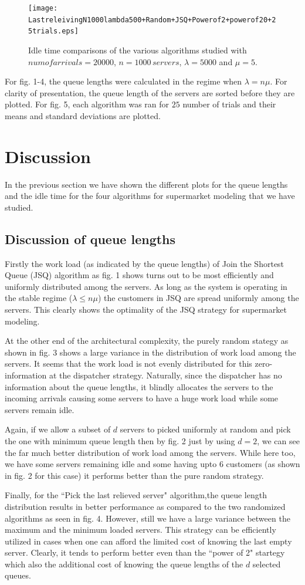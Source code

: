 \documentclass[a4paper,english,12pt]{article}
\begin{document}
\begin{figure}[H]
\centering
\texttt{[image: LastreleivingN1000lambda500+Random+JSQ+Powerof2+powerof20+25trials.eps]}
\caption{Idle time comparisons of the various algorithms studied with $num of arrivals = 20000$, $n = 1000 \, servers$, $\lambda = 5000$ and $\mu = 5$.} 
\end{figure}
For fig. 1-4, the queue lengths were calculated in the regime when $\lambda = n\mu$.  For clarity of presentation, the queue length of the servers are sorted before they are plotted. For fig. 5, each algorithm was ran for $25$ number of trials and their means and standard deviations are plotted. 
\section{Discussion}
In the previous section we have shown the different plots for the queue lengths and the idle time for the four algorithms for supermarket modeling that we have studied.
\subsection{Discussion of queue lengths}
\par Firstly the work load (as indicated by the queue lengths) of Join the Shortest Queue (JSQ) algorithm as fig. 1 shows turns out to be most efficiently and uniformly distributed among the servers. As long as the system is operating in the stable regime ($\lambda \leq n\mu$) the customers in JSQ are spread uniformly among the servers. This clearly shows the optimality of the JSQ strategy for supermarket modeling.
\par At the other end of the architectural complexity, the purely random stategy as shown in fig. 3 shows a large variance in the distribution of work load among the servers. It seems that the work load is not evenly distributed for this zero-information at the dispatcher strategy. Naturally, since the dispatcher has no information about the queue lengths, it blindly allocates the servers to the incoming arrivals causing some servers to have a huge work load while some servers remain idle.
\par Again, if we allow a subset of $d$ servers to picked uniformly at random and pick the one with minimum queue length then by fig. 2 just by using $d=2$, we can see the far much better distribution of work load among the servers. While here too, we have some servers remaining idle and some having upto 6 customers (as shown in fig. 2 for this case) it performs better than the pure random strategy.
\par Finally, for the ``Pick the last relieved server" algorithm,the queue length distribution results in better performance as compared to the two randomized algorithms as seen in fig. 4. However, still we have a large variance between the maximum and the minimum loaded servers. This strategy can be efficiently utilized in cases when one can afford the limited cost of knowing the last empty server. Clearly, it tends to perform better even than the ``power of 2" startegy which also the additional cost of knowing the queue lengths of the $d$ selected queues.
\end{document}
